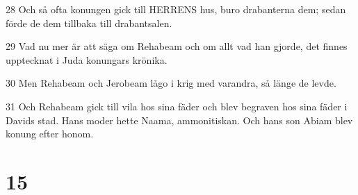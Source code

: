 \par 28 Och så ofta konungen gick till HERRENS hus, buro drabanterna dem; sedan förde de dem tillbaka till drabantsalen.
\par 29 Vad nu mer är att säga om Rehabeam och om allt vad han gjorde, det finnes upptecknat i Juda konungars krönika.
\par 30 Men Rehabeam och Jerobeam lågo i krig med varandra, så länge de levde.
\par 31 Och Rehabeam gick till vila hos sina fäder och blev begraven hos sina fäder i Davids stad. Hans moder hette Naama, ammonitiskan. Och hans son Abiam blev konung efter honom.

\chapter{15}

